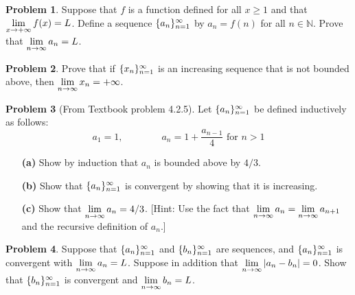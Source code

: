 \documentclass[12pt]{article}
\newcommand{\N}{{\mathbb N}}
\theoremstyle{definition}
\newtheorem{problem}{Problem}
\newenvironment{answer}{\par\medskip\bgroup\color{darkblue}}{\egroup\medskip}
\begin{document}
\begin{answer}
\end{answer}




\begin{problem} %
Suppose that $f$ is a function defined for all $x\ge 1$ and that $\displaystyle\lim_{x\to+\infty}f(x)=L$.
Define a sequence $\{a_n\}_{n=1}^\infty$ by $a_n=f(n)$ for all $n\in\N$.  Prove that ${\displaystyle\lim_{n\to\infty} a_n}=L$.
\end{problem}

\begin{answer}
\end{answer}




\begin{problem}  %
Prove that if $\{x_n\}_{n=1}^\infty$ is an increasing sequence that is not bounded above,
then ${\displaystyle\lim_{n\to\infty} x_n} = +\infty$.
\end{problem}

\begin{answer}
\end{answer}




\begin{problem}[From Textbook problem 4.2.5]  %
Let $\{a_n\}_{n=1}^\infty$ be defined inductively as follows: 
$$a_1=1,\qquad\qquad a_n = 1 + \frac{a_{n-1}}{4}\mbox{\ \ for }n>1$$
\begin{itemize}
\item[\bf(a)]
   Show by induction that $a_n$ is bounded above by $4/3$.
\item[\bf(b)]
    Show that $\{a_n\}_{n=1}^\infty$ is convergent by showing that it is increasing.
\item[\bf(c)]
    Show that ${\displaystyle\lim_{n\to\infty} a_n} = 4/3$. [Hint: Use the fact that
    ${\displaystyle\lim_{n\to\infty} a_n} = \displaystyle\lim_{n\to\infty}a_{n+1}$ and the recursive
    definition of $a_n$.]
\end{itemize}
\end{problem}

\begin{answer}
\end{answer}





\begin{problem}  %
Suppose that $\{a_n\}_{n=1}^\infty$ and $\{b_n\}_{n=1}^\infty$ are sequences, and $\{a_n\}_{n=1}^\infty$ is convergent with ${\displaystyle\lim_{n\to\infty} a_n} = L$.
Suppose in addition that $\displaystyle\lim_{n\to\infty}|a_n-b_n| = 0$.  Show that $\{b_n\}_{n=1}^\infty$ is convergent
and ${\displaystyle\lim_{n\to\infty} b_n} = L$.
\end{problem}

\begin{answer}
\end{answer}
\end{document}
